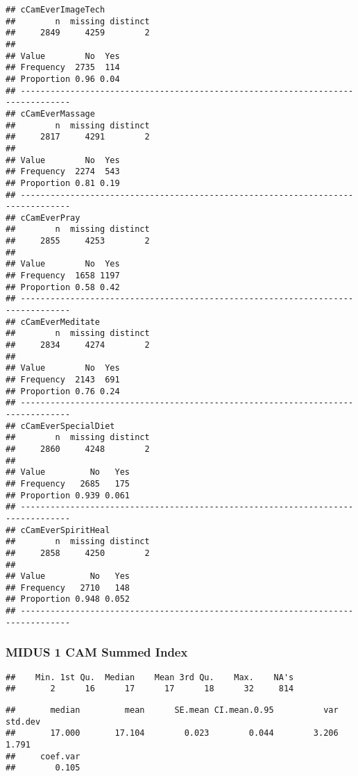 \documentclass[
]{article}
\begin{document}
\begin{verbatim}
## cCamEverImageTech 
##        n  missing distinct 
##     2849     4259        2 
##                     
## Value        No  Yes
## Frequency  2735  114
## Proportion 0.96 0.04
## --------------------------------------------------------------------------------
## cCamEverMassage 
##        n  missing distinct 
##     2817     4291        2 
##                     
## Value        No  Yes
## Frequency  2274  543
## Proportion 0.81 0.19
## --------------------------------------------------------------------------------
## cCamEverPray 
##        n  missing distinct 
##     2855     4253        2 
##                     
## Value        No  Yes
## Frequency  1658 1197
## Proportion 0.58 0.42
## --------------------------------------------------------------------------------
## cCamEverMeditate 
##        n  missing distinct 
##     2834     4274        2 
##                     
## Value        No  Yes
## Frequency  2143  691
## Proportion 0.76 0.24
## --------------------------------------------------------------------------------
## cCamEverSpecialDiet 
##        n  missing distinct 
##     2860     4248        2 
##                       
## Value         No   Yes
## Frequency   2685   175
## Proportion 0.939 0.061
## --------------------------------------------------------------------------------
## cCamEverSpiritHeal 
##        n  missing distinct 
##     2858     4250        2 
##                       
## Value         No   Yes
## Frequency   2710   148
## Proportion 0.948 0.052
## --------------------------------------------------------------------------------
\end{verbatim}

\hypertarget{midus-1-cam-summed-index}{%
\subsubsection{MIDUS 1 CAM Summed
Index}\label{midus-1-cam-summed-index}}

\begin{verbatim}
##    Min. 1st Qu.  Median    Mean 3rd Qu.    Max.    NA's 
##       2      16      17      17      18      32     814
\end{verbatim}

\begin{verbatim}
##       median         mean      SE.mean CI.mean.0.95          var      std.dev 
##       17.000       17.104        0.023        0.044        3.206        1.791 
##     coef.var 
##        0.105
\end{verbatim}
\end{document}
